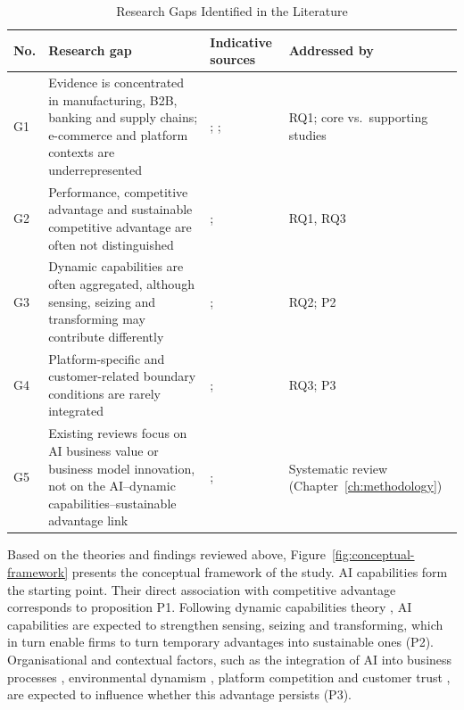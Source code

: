 \begin{table}[H]
  \centering
  \caption{Research Gaps Identified in the Literature}
  \label{tab:gaps}
  \small{}
  \begin{tabularx}{\textwidth}{>{\raggedright\arraybackslash}p{0.7cm}>{\raggedright\arraybackslash}X>{\raggedright\arraybackslash}p{3.3cm}>{\raggedright\arraybackslash}p{2.7cm}}
    \toprule
    \textbf{No.} & \textbf{Research gap} & \textbf{Indicative sources} & \textbf{Addressed by} \\
    \midrule
    G1 & Evidence is concentrated in manufacturing, B2B, banking and supply chains; e-commerce and platform contexts are underrepresented & \textcite[574]{sjodin2021}; \textcite[1]{alnofeli2026}; \textcite[1]{dai2026} & RQ1; core vs.\ supporting studies \\
    \addlinespace
    G2 & Performance, competitive advantage and sustainable competitive advantage are often not distinguished & \textcite[1]{wu2026}; \textcite[1]{liang2026} & RQ1, RQ3 \\
    \addlinespace
    G3 & Dynamic capabilities are often aggregated, although sensing, seizing and transforming may contribute differently & \textcite[1]{huang2026}; \textcite[240]{hossain2022} & RQ2; P2 \\
    \addlinespace
    G4 & Platform-specific and customer-related boundary conditions are rarely integrated & \textcite[187]{chen2026}; \textcite[1]{vu2026} & RQ3; P3 \\
    \addlinespace
    G5 & Existing reviews focus on AI business value or business model innovation, not on the AI--dynamic capabilities--sustainable advantage link & \textcite[1709]{enholm2022}; \textcite[1]{jorzik2024} & Systematic review (Chapter~\ref{ch:methodology}) \\
    \bottomrule
  \end{tabularx}
\end{table}

Based on the theories and findings reviewed above, Figure~\ref{fig:conceptual-framework} presents the conceptual framework of the study. AI capabilities form the starting point. Their direct association with competitive advantage corresponds to proposition P1. Following dynamic capabilities theory \parencite[1319]{teece2007}, AI capabilities are expected to strengthen sensing, seizing and transforming, which in turn enable firms to turn temporary advantages into sustainable ones (P2). Organisational and contextual factors, such as the integration of AI into business processes \parencite[1549]{weber2023}, environmental dynamism \parencite[10]{li2025}, platform competition \parencite[187]{chen2026} and customer trust \parencite[1]{vu2026}, are expected to influence whether this advantage persists (P3).


